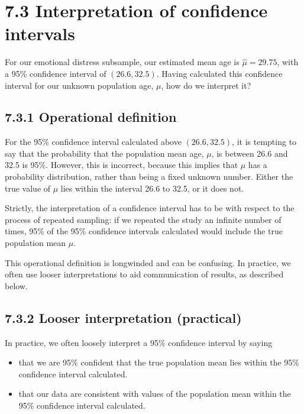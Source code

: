 \documentclass[letterpaper,10pt,english]{jupyterBook}
\begin{document}
\section{7.3 Interpretation of confidence intervals}
\label{\detokenize{07.d. Frequentist I:interpretation-of-confidence-intervals}}\label{\detokenize{07.d. Frequentist I::doc}}
\sphinxAtStartPar
For our emotional distress sub\sphinxhyphen{}sample, our estimated mean age is \(\hat{\mu}= 29.75\), with a 95\% confidence interval of \((26.6, 32.5)\). Having calculated this confidence interval for our unknown population age, \(\mu\), how do we interpret it?


\subsection{7.3.1 Operational definition}
\label{\detokenize{07.d. Frequentist I:operational-definition}}
\sphinxAtStartPar
For the 95\% confidence interval calculated above \((26.6, 32.5)\), it is tempting to say that the probability that the population mean age, \(\mu\), is between 26.6 and 32.5 is 95\%. However, this is incorrect, because this  implies that \(\mu\) has a probability distribution, rather than being a fixed unknown number. Either the true value of \(\mu\) lies within the interval 26.6 to 32.5, or it does not.

\sphinxAtStartPar
Strictly, the interpretation of a confidence interval has to be with respect to the process of repeated sampling: if we repeated the study an infinite number of times, 95\% of the 95\% confidence intervals calculated would include the true population mean \(\mu\).

\sphinxAtStartPar
This operational definition is long\sphinxhyphen{}winded and can be confusing. In practice,  we often use looser interpretations to aid communication of results, as described below.


\subsection{7.3.2 Looser interpretation (practical)}
\label{\detokenize{07.d. Frequentist I:looser-interpretation-practical}}
\sphinxAtStartPar
In practice,  we often loosely interpret a 95\% confidence interval by saying
\begin{itemize}
\item {} 
\sphinxAtStartPar
that we are 95\% confident that the true population mean lies within the 95\% confidence interval calculated.

\item {} 
\sphinxAtStartPar
that our data are consistent with values of the population mean within the 95\% confidence interval calculated.

\end{itemize}
\end{document}
